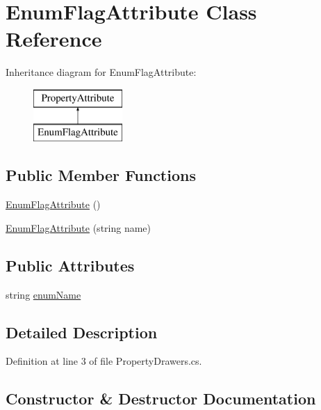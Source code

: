 \hypertarget{class_enum_flag_attribute}{}\section{Enum\+Flag\+Attribute Class Reference}
\label{class_enum_flag_attribute}
Inheritance diagram for Enum\+Flag\+Attribute\+:\begin{figure}[H]
\begin{center}
\leavevmode
\includegraphics[height=2.000000cm]{class_enum_flag_attribute}
\end{center}
\end{figure}
\subsection*{Public Member Functions}
\begin{DoxyCompactItemize}
\item 
\mbox{\hyperlink{class_enum_flag_attribute_a2a7db1da8f300050097cc0b428de7624}{Enum\+Flag\+Attribute}} ()
\item 
\mbox{\hyperlink{class_enum_flag_attribute_ae410b2b26b66afb5c2b63a81fb28bfcc}{Enum\+Flag\+Attribute}} (string name)
\end{DoxyCompactItemize}
\subsection*{Public Attributes}
\begin{DoxyCompactItemize}
\item 
string \mbox{\hyperlink{class_enum_flag_attribute_a766d6f5622734487542a0855bb2af743}{enum\+Name}}
\end{DoxyCompactItemize}


\subsection{Detailed Description}


Definition at line 3 of file Property\+Drawers.\+cs.



\subsection{Constructor \& Destructor Documentation}
\mbox{\label{class_enum_flag_attribute_a2a7db1da8f300050097cc0b428de7624}} 
